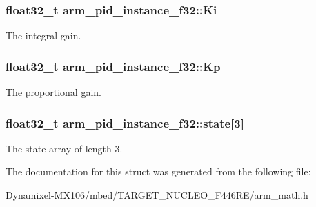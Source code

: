 \subsubsection[{\texorpdfstring{Ki}{Ki}}]{\setlength{\rightskip}{0pt plus 5cm}float32\+\_\+t arm\+\_\+pid\+\_\+instance\+\_\+f32\+::\+Ki}\hypertarget{structarm__pid__instance__f32_ac0feffde05fe391eeab3bf78e953830a}{}\label{structarm__pid__instance__f32_ac0feffde05fe391eeab3bf78e953830a}
The integral gain. 
\subsubsection[{\texorpdfstring{Kp}{Kp}}]{\setlength{\rightskip}{0pt plus 5cm}float32\+\_\+t arm\+\_\+pid\+\_\+instance\+\_\+f32\+::\+Kp}\hypertarget{structarm__pid__instance__f32_aa9b9aa9e413c6cec376a9dddc9f01ebe}{}\label{structarm__pid__instance__f32_aa9b9aa9e413c6cec376a9dddc9f01ebe}
The proportional gain. 
\subsubsection[{\texorpdfstring{state}{state}}]{\setlength{\rightskip}{0pt plus 5cm}float32\+\_\+t arm\+\_\+pid\+\_\+instance\+\_\+f32\+::state\mbox{[}3\mbox{]}}\hypertarget{structarm__pid__instance__f32_afd394e1e52fb1d526aa472c83b8f2464}{}\label{structarm__pid__instance__f32_afd394e1e52fb1d526aa472c83b8f2464}
The state array of length 3. 

The documentation for this struct was generated from the following file\+:\begin{DoxyCompactItemize}
\item 
Dynamixel-\/\+M\+X106/mbed/\+T\+A\+R\+G\+E\+T\+\_\+\+N\+U\+C\+L\+E\+O\+\_\+\+F446\+R\+E/arm\+\_\+math.\+h\end{DoxyCompactItemize}
